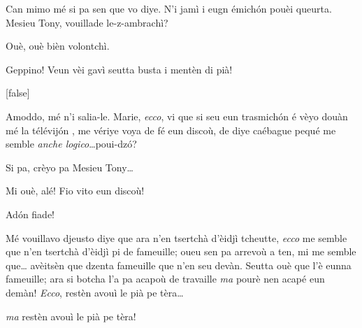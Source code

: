 \begin{drama}

\Mariespeaks Can mimo mé si pa sen que vo diye. N'i jamì i eugn émich\'on pouèi queurta. Mesieu Tony, vouillade le-z-ambrachì?

\Turispeaks Ouè, ouè bièn volontchì.

\Mariespeaks{} Geppino! Veun vèi gavì seutta busta i mentèn di pià!

[false]%



\Turispeaks Amoddo, mé n'i salia-le. Marie, \textit{ecco}, vi que si seu eun trasmich\'on é vèyo douàn mé la télévij\'on , me vériye voya de fé eun discoù, de diye caébague pequé me semble \textit{anche logico}\ldots poui-dz\'o?


\Mariespeaks{} Si pa, crèyo pa Mesieu Tony\ldots

\Turispeaks{} Mi ouè, alé! Fio vito eun discoù!

\Mariespeaks{} Ad\'on fiade!


\Turispeaks Mé vouillavo djeusto diye que ara n'en tsertchà d'èidjì tcheutte, \textit{ecco} me semble que n'en tsertchà d'èidjì pi de fameuille; oueu sen pa arrevoù a ten, mi me semble que\ldots {} avèitsèn que dzenta fameuille que n'en seu devàn. Seutta ouè que l'è eunna fameuille; ara si botcha l'a pa acapoù de travaille \textit{ma} pourè nen acapé eun demàn! \textit{Ecco}, restèn avouì le pià pe tèra\ldots


\Turispeaks \textit{ma} restèn avouì le pià pe tèra!



\end{drama}
